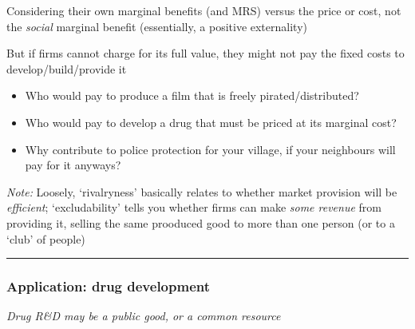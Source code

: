\documentclass[]{article}
\providecommand{\tightlist}{%
  \setlength{\itemsep}{0pt}\setlength{\parskip}{0pt}}
\begin{document}
\bigskip

Considering their own marginal benefits (and MRS) versus the price or
cost, not the \emph{social} marginal benefit (essentially, a positive
externality)

\bigskip

But if firms cannot charge for its full value, they might not pay the
fixed costs to develop/build/provide it

\begin{itemize}
\tightlist
\item
  Who would pay to produce a film that is freely pirated/distributed?
\item
  Who would pay to develop a drug that must be priced at its marginal
  cost?
\item
  Why contribute to police protection for your village, if your
  neighbours will pay for it anyways?
\end{itemize}

\emph{Note:} Loosely, `rivalryness' basically relates to whether market
provision will be \emph{efficient}; `excludability' tells you whether
firms can make \emph{some revenue} from providing it, selling the same
prooduced good to more than one person (or to a `club' of people)

\begin{center}\rule{0.5\linewidth}{\linethickness}\end{center}

\hypertarget{application-drug-development}{%
\subsubsection{Application: drug
development}\label{application-drug-development}}

\emph{Drug R\&D may be a public good, or a common resource}
\end{document}
